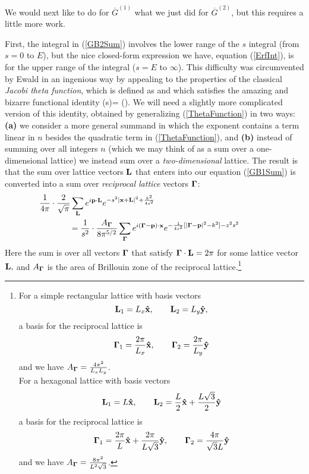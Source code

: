 \documentclass[letterpaper]{article}
\newcommand{\GB}{\overline{G}}
\begin{document}
We would next like to do for $\GB^{(1)}$ what we just did for $\GB^{(2)}$,
but this requires a little more work. 

First, the integral in (\ref{GB2Sum}) involves the lower range of the 
$s$ integral (from $s=0$ to $E$), but the nice closed-form
expression we have, equation (\ref{ErfInt}), is for the upper range 
of the integral ($s=E$ to $\infty$). This difficulty was circumvented 
by Ewald in an ingenious way by appealing to the properties of the 
classical \textit{Jacobi theta function}, which is defined as 
and which satisfies the amazing and bizarre functional identity 
{ \theta(s)=\sqrt{} \cdot \theta\left(\right).}
We will need a slightly more complicated version of this identity,
obtained by generalizing (\ref{ThetaFunction}) in two ways: 
\textbf{(a)} we consider a more general summand in which the exponent
contains a term linear in $n$ besides the quadratic term 
in (\ref{ThetaFunction}), and 
\textbf{(b)} instead of summing over all integers $n$ (which we may 
think of as a sum over a one-dimensional lattice) we instead sum 
over a \textit{two-dimensional} lattice.
The result is that the sum over lattice vectors $\mathbf{L}$ that enters into
our equation (\ref{GB1Sum}) is converted into a sum over
\textit{reciprocal lattice} vectors $\boldsymbol{\Gamma}$:
\begin{align}
&\hspace{-0.5in}
 \frac{1}{4\pi} \cdot \frac{2}{\sqrt\pi} \sum_{\vb L} e^{i \vb p \cdot \vb L}
 e^{-s^2|\vb x + \vb L|^2 + \frac{k^2}{4s^2}}
\nn
&=\frac{1}{s^2} \cdot \frac{A_{\BG}}{8\pi^{5/2}}
 \sum_{\BG} e^{i(\BG-\vb p) \cdot \vb x} 
            e^{-\frac{1}{4s^2}[|\BG - \vb p|^2 - k^2] - z^2 s^2}
\label{DirectToReciprocal}
\end{align}
Here the sum is over all vectors $\boldsymbol{\Gamma}$ that satisfy 
$\boldsymbol{\Gamma} \cdot \mathbf{L}=2\pi$ for some lattice vector $\mathbf{L},$
and $A_{\boldsymbol{\Gamma}}$ is the area of Brillouin zone of the 
reciprocal lattice.\footnote{For a simple rectangular 
lattice with basis vectors 
$$\mathbf{L}_1=L_x\mathbf{\hat x}, \qquad \mathbf{L}_2=L_y\mathbf{\hat y},$$
a basis for the reciprocal lattice is 
$$\boldsymbol{\Gamma}_1=\frac{2\pi}{L_x}\mathbf{\hat x},\qquad \boldsymbol{\Gamma}_2=\frac{2\pi}{L_y}\mathbf{\hat y}$$
and we have $A_{\boldsymbol{\Gamma}}=\frac{4\pi^2}{L_x L_y}$.\\
For a hexagonal lattice with basis vectors 
$$ \mathbf{L}_1=L\mathbf{\hat x}, \qquad 
   \mathbf{L}_2=\frac{L}{2}\mathbf{\hat x} + \frac{L\sqrt{3}}{2}\mathbf{\hat y}
$$
a basis for the reciprocal lattice is 
$$ \boldsymbol{\Gamma}_1=\frac{2\pi}{L}\mathbf{\hat x} + \frac{2\pi}{L\sqrt{3}}\mathbf{\hat y},
   \qquad 
   \boldsymbol{\Gamma}_2=\frac{4\pi}{\sqrt{3} L}\mathbf{\hat y}
$$
and we have $A_{\boldsymbol{\Gamma}}=\frac{8\pi^2}{L^2 \sqrt{3}}$.
}
\end{document}
